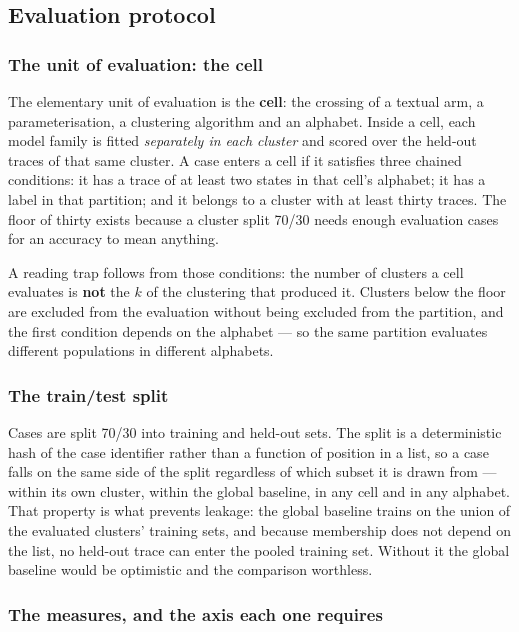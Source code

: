 \subsection{Evaluation protocol}\label{sec:protocol}

\subsubsection*{The unit of evaluation: the cell}

The elementary unit of evaluation is the \textbf{cell}: the crossing of a textual arm, a
parameterisation, a clustering algorithm and an alphabet. Inside a cell, each model family is
fitted \emph{separately in each cluster} and scored over the held-out traces of that same
cluster. A case enters a cell if it satisfies three chained conditions: it has a trace of at
least two states in that cell's alphabet; it has a label in that partition; and it belongs to a
cluster with at least thirty traces. The floor of thirty exists because a cluster split 70/30
needs enough evaluation cases for an accuracy to mean anything.

A reading trap follows from those conditions: the number of clusters a cell evaluates is
\textbf{not} the $k$ of the clustering that produced it. Clusters below the floor are excluded
from the evaluation without being excluded from the partition, and the first condition depends on
the alphabet --- so the same partition evaluates different populations in different alphabets.

\subsubsection*{The train/test split}

Cases are split 70/30 into training and held-out sets. The split is a deterministic hash of the
case identifier rather than a function of position in a list, so a case falls on the same side of
the split regardless of which subset it is drawn from --- within its own cluster, within the
global baseline, in any cell and in any alphabet. That property is what prevents leakage: the
global baseline trains on the union of the evaluated clusters' training sets, and because
membership does not depend on the list, no held-out trace can enter the pooled training set.
Without it the global baseline would be optimistic and the comparison worthless.

\subsubsection*{The measures, and the axis each one requires}

